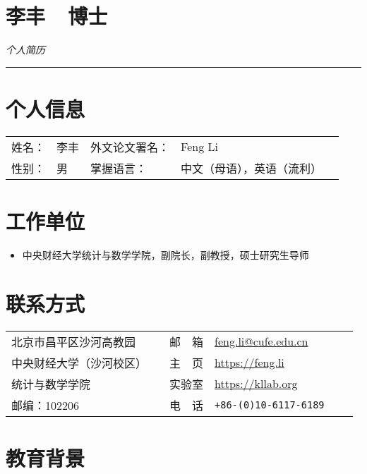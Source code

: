 \documentclass[twoside,a4paper,10pt]{amsart}
\begin{document}
\thispagestyle{plain}
\section*{\Huge{李丰~~博士}}
\begin{center}
  \emph{\huge 个人简历}
\end{center}
\rule{\textwidth}{.01cm}

\section*{个人信息}
\begin{tabular}{l p{4cm} l  l l}
  姓名：& 李丰& 外文论文署名： &   Feng Li\\
  性别： & 男  &掌握语言： & 中文（母语），英语（流利）\\
\end{tabular}

\section*{工作单位}

\begin{itemize}
\item [] 中央财经大学统计与数学学院，副院长，副教授，硕士研究生导师
\end{itemize}

\section*{联系方式}

\begin{tabular}{ l l |  l  l l l}
  北京市昌平区沙河高教园   &  & 邮　箱 & \href{mailto:feng.li@cufe.edu.cn}{\url{feng.li@cufe.edu.cn}} \\
  中央财经大学（沙河校区） &  & 主　页 & \url{https://feng.li}                                  \\
  统计与数学学院           &  & 实验室 & \url{https://kllab.org}                                    \\
  邮编：102206             &  & 电　话 & \texttt{+86-(0)10-6117-6189}                                    \\
\end{tabular}

\section*{教育背景}
\end{document}
